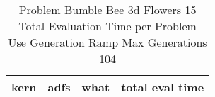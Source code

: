 \begin{table}[H]
\caption{Problem  Bumble Bee 3d  Flowers 15\\Total Evaluation Time per Problem \\ Use Generation Ramp  Max Generations 104\\}
\begin{center}
\scalebox{1.0} %
{
\begin{tabular}{lllr}
\hline
kern & adfs & what & total eval time \\
\hline


\end{tabular}
}
\end{center}
\end{table}

